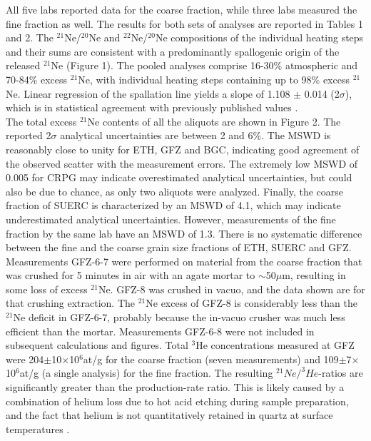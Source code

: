 \documentclass[authoryear,review,12pt]{elsarticle}
\begin{document}
All five labs reported data for the coarse fraction, while three labs
measured the fine fraction as well. The results for both sets of
analyses are reported in Tables 1 and 2.
The $^{21}$Ne/$^{20}$Ne and $^{22}$Ne/$^{20}$Ne compositions of the
individual heating steps and their sums are consistent with a
predominantly spallogenic origin of the released $^{21}$Ne (Figure
1). The pooled analyses comprise 16-30\% atmospheric
and 70-84\% excess $^{21}$Ne, with individual heating steps containing
up to 98\% excess $^{21}$Ne.  Linear regression of the spallation line
yields a slope of 1.108 $\pm$ 0.014 (2$\sigma$), which is in
statistical agreement with previously published values \citep[Table 8
  of][]{niedermann2002}.  \\

The total excess $^{21}$Ne contents of all the aliquots are shown in
Figure 2.  The reported 2$\sigma$ analytical uncertainties are between
2 and 6\%. The MSWD \citep[Mean Square of the Weighted Deviates,
  a.k.a. `reduced Chi-square',][]{mcintyre1966} is reasonably close to
unity for ETH, GFZ and BGC, indicating good agreement of the observed
scatter with the measurement errors. The extremely low MSWD of 0.005
for CRPG may indicate overestimated analytical uncertainties, but
could also be due to chance, as only two aliquots were
analyzed. Finally, the coarse fraction of SUERC is characterized by an
MSWD of 4.1, which may indicate underestimated analytical
uncertainties. However, measurements of the fine fraction by the same
lab have an MSWD of 1.3. There is no systematic difference between the
fine and the coarse grain size fractions of ETH, SUERC and GFZ.
Measurements GFZ-6-7 were performed on material from the coarse
fraction that was crushed for 5 minutes in air with an agate mortar to
$\sim$50$\mu$m, resulting in some loss of excess $^{21}$Ne.  GFZ-8 was
crushed in vacuo, and the data shown are for that crushing extraction.
The $^{21}$Ne excess of GFZ-8 is considerably less than the $^{21}$Ne
deficit in GFZ-6-7, probably because the in-vacuo crusher was much
less efficient than the mortar.  Measurements GFZ-6-8 were not
included in subsequent calculations and figures.  Total $^3$He
concentrations measured at GFZ were 204$\pm$10$\times$10$^6$at/g for
the coarse fraction (seven measurements) and
109$\pm$7$\times$10$^6$at/g (a single analysis) for the fine
fraction. The resulting $^{21}Ne/^3He$-ratios are significantly
greater than the production-rate ratio. This is likely caused by a
combination of helium loss due to hot acid etching during sample
preparation, and the fact that helium is not quantitatively retained
in quartz at surface temperatures \citep{shuster2005b}.\\
\end{document}
